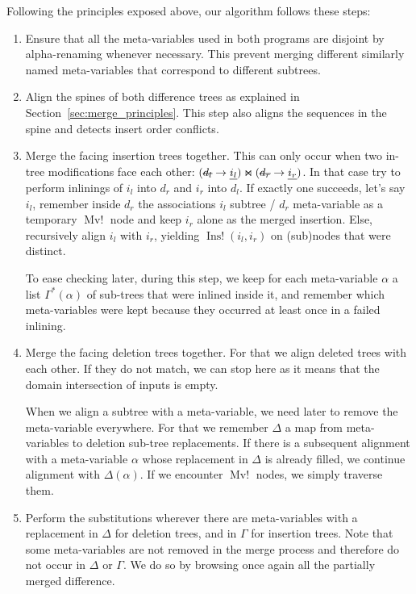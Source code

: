 \documentclass[a4paper,11pt]{article}
\newcommand\merge{\mathbin{\Join}}
\newcommand\del[1]{\text{\st{$#1$}}}
\newcommand\ins[1]{\text{\ul{$#1$}}}
\newcommand\change[2]{\del{#1} \rightarrow \ins{#2}}
\DeclareMathOperator\InsConflict{Ins!}
\DeclareMathOperator\MvConflict{Mv!}
\begin{document}
Following the principles exposed above, our algorithm follows these steps:
\begin{enumerate}
 \item Ensure that all the meta-variables used in both programs are
   disjoint by alpha-renaming whenever necessary. This prevent merging different
similarly named meta-variables that correspond to different subtrees.

 \item Align the spines of both difference trees as explained in
Section~\ref{sec:merge_principles}. This step also aligns the sequences in the
spine and detects insert order conflicts.

 \item Merge the facing insertion trees together. This can only occur when two
in-tree modifications face each other: $(\change{d_l}{i_l}) \merge
(\change{d_r}{i_r})$.
 In that case try to perform inlinings of $i_l$ into $d_r$ and $i_r$ into $d_l$.
If exactly one succeeds, let's say $i_l$, remember inside $d_r$ the associations
$i_l$ subtree / $d_r$ meta-variable as a temporary $\MvConflict$ node and
keep $i_r$ alone as the merged insertion. Else, recursively align $i_l$ with
$i_r$, yielding $\InsConflict(i_l, i_r)$ on (sub)nodes that were distinct.

 To ease checking later, during this step, we keep for each meta-variable
$\alpha$ a list $\Gamma^*(\alpha)$ of sub-trees that were inlined inside it, and
remember which meta-variables were kept because they occurred at least once in
a failed inlining.

 \item Merge the facing deletion trees together. For that we align deleted trees
with each other. If they do not match, we can stop here as it means that the
domain intersection of inputs is empty.

 When we align a subtree with a meta-variable, we need later to remove the
meta-variable everywhere. For that we remember $\Delta$ a map from
meta-variables to deletion sub-tree replacements. If there is a subsequent
alignment with a meta-variable $\alpha$ whose replacement in $\Delta$ is already
filled, we continue alignment with $\Delta(\alpha)$. If we encounter
$\MvConflict$ nodes, we simply traverse them.

 \item Perform the substitutions wherever there are meta-variables with a
replacement in $\Delta$ for deletion trees, and in $\Gamma$ for insertion trees.
Note that some meta-variables are not removed in the merge process and therefore
do not occur in $\Delta$ or $\Gamma$. We do so by browsing once again all the
partially merged difference.


\end{enumerate}
\end{document}
